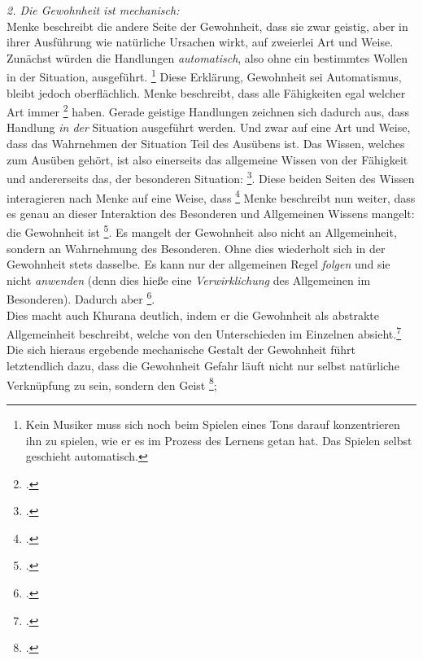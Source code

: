 \documentclass[12pt, a4paper, openany]{report}
\begin{document}
\emph{2. Die Gewohnheit ist mechanisch:}\\
Menke beschreibt die andere Seite der Gewohnheit, dass sie zwar geistig, aber in ihrer Ausführung wie natürliche Ursachen wirkt, auf zweierlei Art und Weise.
Zunächst würden die Handlungen \emph{automatisch}, also ohne ein bestimmtes Wollen in der Situation, ausgeführt.
\footnote{Kein Musiker muss sich noch beim Spielen eines Tons darauf konzentrieren ihn zu spielen, wie er es im Prozess des Lernens getan hat. 
Das Spielen selbst geschieht automatisch.}
Diese Erklärung, Gewohnheit sei Automatismus, bleibt jedoch oberflächlich.
Menke beschreibt, dass alle Fähigkeiten egal welcher Art immer \footcite[][132]{menke_autonomie_2018} haben. 
Gerade geistige Handlungen zeichnen sich dadurch aus, dass Handlung \emph{in der} Situation ausgeführt werden.
Und zwar auf eine Art und Weise, dass das Wahrnehmen der Situation Teil des Ausübens ist. 
Das Wissen, welches zum Ausüben gehört, ist also einerseits das allgemeine Wissen von der Fähigkeit und andererseits das, der besonderen Situation: \footcite[][133]{menke_autonomie_2018}.
Diese beiden Seiten des Wissen interagieren nach Menke auf eine Weise, dass \footcite[][133]{menke_autonomie_2018}
Menke beschreibt nun weiter, dass es genau an dieser Interaktion des Besonderen und Allgemeinen Wissens mangelt:
die Gewohnheit ist \footcite[][§410 Zusatz, S. 188]{hegel_enzyklopädie_1969}.
Es mangelt der Gewohnheit also nicht an Allgemeinheit, sondern an Wahrnehmung des Besonderen.
Ohne dies wiederholt sich in der Gewohnheit stets dasselbe.
Es kann nur der allgemeinen Regel \emph{folgen} und sie nicht \emph{anwenden} (denn dies hieße eine \emph{Verwirklichung} des Allgemeinen im Besonderen). 
Dadurch aber \footcite[][134]{menke_autonomie_2018}.\\
Dies macht auch Khurana deutlich, indem er die Gewohnheit als abstrakte Allgemeinheit beschreibt, welche von den Unterschieden im Einzelnen absieht.\footcite[Vgl.][431]{khurana_freiheit_2017}
Die sich hieraus ergebende mechanische Gestalt der Gewohnheit führt letztendlich dazu, dass die Gewohnheit Gefahr läuft nicht nur selbst natürliche Verknüpfung zu sein, sondern den Geist \footcite[][430]{khurana_freiheit_2017};
\end{document}
